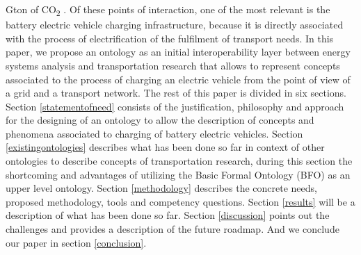 Gton of CO\textsubscript{2} \cite{IEA.2023}. Of these points of interaction, one
of the most relevant is the battery electric vehicle charging infrastructure,
because it is directly associated with the process of electrification of the
fulfilment of transport needs. In this paper, we propose an ontology as an
initial interoperability layer between energy systems analysis and
transportation research that allows to represent concepts associated to the
process of charging an electric vehicle from the point of view of a grid and a
transport network. The rest of this paper is divided in six sections. Section
\ref{statementofneed} consists of the justification, philosophy and approach for
the designing of an ontology to allow the description of concepts and phenomena
associated to charging of battery electric vehicles. Section
\ref{existingontologies} describes what has been done so far in context of other
ontologies to describe concepts of transportation research, during this section
the shortcoming and advantages of utilizing the Basic Formal Ontology (BFO)
\cite{Arp.2015} as an upper level ontology. Section \ref{methodology} describes
the concrete needs, proposed methodology, tools and competency questions.
Section \ref{results} will be a description of what has been done so far.
Section \ref{discussion} points out the challenges and provides a description of
the future roadmap. And we conclude our paper in section \ref{conclusion}.


